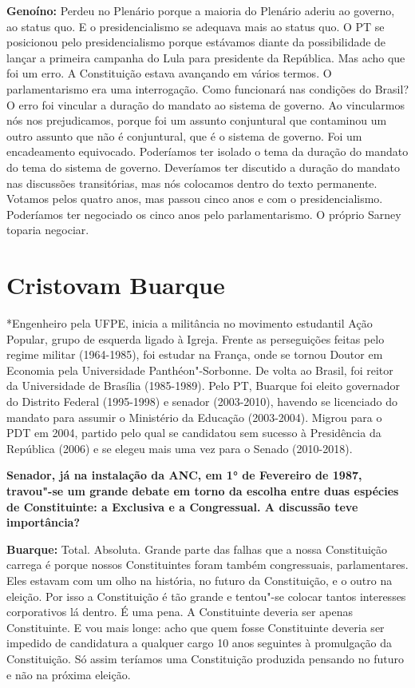 \textbf{Genoíno:} Perdeu no Plenário porque a maioria do Plenário aderiu
ao governo, ao status quo. E o presidencialismo se adequava mais ao
status quo. O PT se posicionou pelo presidencialismo porque estávamos
diante da possibilidade de lançar a primeira campanha do Lula para
presidente da República. Mas acho que foi um erro. A Constituição estava
avançando em vários termos. O parlamentarismo era uma interrogação. Como
funcionará nas condições do Brasil? O erro foi vincular a duração do
mandato ao sistema de governo. Ao vincularmos nós nos prejudicamos,
porque foi um assunto conjuntural que contaminou um outro assunto que
não é conjuntural, que é o sistema de governo. Foi um encadeamento
equivocado. Poderíamos ter isolado o tema da duração do mandato do tema
do sistema de governo. Deveríamos ter discutido a duração do mandato nas
discussões transitórias, mas nós colocamos dentro do texto permanente.
Votamos pelos quatro anos, mas passou cinco anos e com o
presidencialismo. Poderíamos ter negociado os cinco anos pelo
parlamentarismo. O próprio Sarney toparia negociar.

\section{Cristovam Buarque}

*Engenheiro pela UFPE, inicia a militância no movimento estudantil Ação
Popular, grupo de esquerda ligado à Igreja. Frente as perseguições
feitas pelo regime militar (1964-1985), foi estudar na França, onde se
tornou Doutor em Economia pela Universidade Panthéon"-Sorbonne. De volta
ao Brasil, foi reitor da Universidade de Brasília (1985-1989). Pelo PT,
Buarque foi eleito governador do Distrito Federal (1995-1998) e senador
(2003-2010), havendo se licenciado do mandato para assumir o Ministério
da Educação (2003-2004). Migrou para o PDT em 2004, partido pelo qual se
candidatou sem sucesso à Presidência da República (2006) e se elegeu
mais uma vez para o Senado (2010-2018).

\textbf{Senador, já na instalação da ANC, em 1° de Fevereiro de 1987,
travou"-se um grande debate em torno da escolha entre duas espécies de
Constituinte: a Exclusiva e a Congressual. A discussão teve
importância?}

\textbf{Buarque:} Total. Absoluta. Grande parte das falhas que a nossa
Constituição carrega é porque nossos Constituintes foram também
congressuais, parlamentares. Eles estavam com um olho na história, no
futuro da Constituição, e o outro na eleição. Por isso a Constituição é
tão grande e tentou"-se colocar tantos interesses corporativos lá dentro.
É uma pena. A Constituinte deveria ser apenas Constituinte. E vou mais
longe: acho que quem fosse Constituinte deveria ser impedido de
candidatura a qualquer cargo 10 anos seguintes à promulgação da
Constituição. Só assim teríamos uma Constituição produzida pensando no
futuro e não na próxima eleição.

